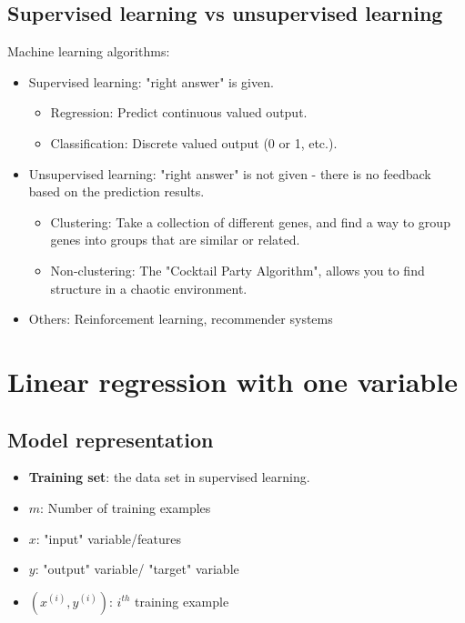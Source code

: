 \subsection{Supervised learning vs unsupervised learning}
\begin{definition} Machine learning algorithms:
\begin{itemize}
  \item Supervised learning: "right answer" is given.
      \begin{itemize}
        \item Regression: Predict continuous valued output.
        \item Classification: Discrete valued output (0 or 1, etc.).
      \end{itemize}
  \item Unsupervised learning: "right answer" is not given - there is no feedback based on the prediction results.
      \begin{itemize}
        \item Clustering: Take a collection of different genes, and find a way to group genes into groups that are similar or related.
        \item Non-clustering: The "Cocktail Party Algorithm", allows you to find structure in a chaotic environment.
      \end{itemize}
  \item Others: Reinforcement learning, recommender systems
\end{itemize}
\end{definition}

\section{Linear regression with one variable}
\subsection{Model representation}
\begin{itemize}
  \item \textbf{Training set}: the data set in supervised learning.
  \item $m$: Number of training examples
  \item $x$: "input" variable/features
  \item $y$: "output" variable/ "target" variable
  \item $(x^{(i)},y^{(i)})$: $i^{th}$ training example
\end{itemize}


